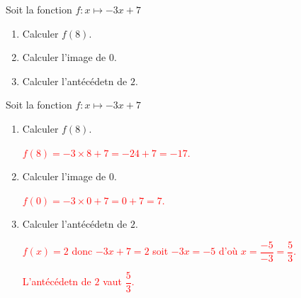\begin{exercice*}
    Soit la fonction $f:x\longmapsto -3x+7$
    \begin{enumerate}
        \item Calculer $f(8)$.
        \item Calculer l'image de $0$.
        \item Calculer l'antécédetn de $2$.
    \end{enumerate}
\end{exercice*}
\begin{corrige}
    Soit la fonction $f:x\longmapsto -3x+7$
    
    \begin{enumerate}
        \item Calculer $f(8)$.
        
        \textcolor{red}{$f(8)=-3\times 8 + 7=-24+7=-17$.}
        \item Calculer l'image de $0$.
        
        \textcolor{red}{$f(0)=-3\times 0 + 7=0+7=7$.}
        \item Calculer l'antécédetn de $2$.
        
        \textcolor{red}{$f(x)=2$ donc $-3x + 7=2$ soit $-3x=-5$ d'où $x=\dfrac{-5}{-3}=\dfrac53$.}

        \textcolor{red}{L'antécédetn de $2$ vaut $\dfrac53$.}
    \end{enumerate}
\end{corrige}
